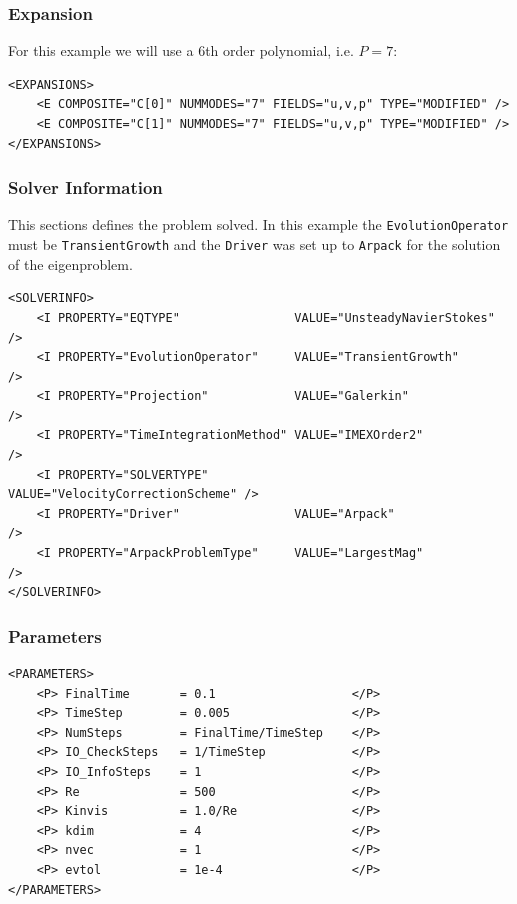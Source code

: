 \subsubsection{Expansion}

For this example we will use a 6th order polynomial, i.e. $P=7$:

      \begin{lstlisting}[style=XMLStyle]
<EXPANSIONS>
    <E COMPOSITE="C[0]" NUMMODES="7" FIELDS="u,v,p" TYPE="MODIFIED" />
    <E COMPOSITE="C[1]" NUMMODES="7" FIELDS="u,v,p" TYPE="MODIFIED" />
</EXPANSIONS>
        \end{lstlisting}

\subsubsection{Solver Information}

This sections defines the problem solved. In this example the \texttt{EvolutionOperator} must be \texttt{TransientGrowth} and the \texttt{Driver} was set up to \texttt{Arpack} for the solution of the eigenproblem.

      \begin{lstlisting}[style=XMLStyle]
<SOLVERINFO>
    <I PROPERTY="EQTYPE"                VALUE="UnsteadyNavierStokes"     />
    <I PROPERTY="EvolutionOperator"     VALUE="TransientGrowth"          />
    <I PROPERTY="Projection"            VALUE="Galerkin"                 />
    <I PROPERTY="TimeIntegrationMethod" VALUE="IMEXOrder2"               />
    <I PROPERTY="SOLVERTYPE"            VALUE="VelocityCorrectionScheme" />
    <I PROPERTY="Driver"                VALUE="Arpack"                   />
    <I PROPERTY="ArpackProblemType"     VALUE="LargestMag"               />
</SOLVERINFO>
                \end{lstlisting}


\subsubsection{Parameters}

      \begin{lstlisting}[style=XMLStyle]
<PARAMETERS>
    <P> FinalTime       = 0.1                   </P>
    <P> TimeStep        = 0.005                 </P>
    <P> NumSteps        = FinalTime/TimeStep    </P>
    <P> IO_CheckSteps   = 1/TimeStep            </P>
    <P> IO_InfoSteps    = 1                     </P>
    <P> Re              = 500                   </P>
    <P> Kinvis          = 1.0/Re                </P>
    <P> kdim            = 4                     </P>
    <P> nvec            = 1                     </P>
    <P> evtol           = 1e-4                  </P>
</PARAMETERS>
                        \end{lstlisting}


